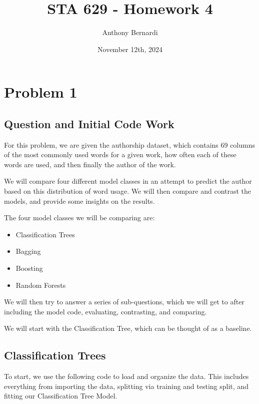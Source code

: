 \documentclass[12pt, letterpaper]{article}
\title{STA 629 - Homework 4}
\author{Anthony Bernardi}
\date{November 12th, 2024}
\begin{document}
\maketitle

\section{Problem 1}

\subsection{Question and Initial Code Work}

For this problem, we are given the authorship dataset, which contains 69 columns of the most commonly used words for a given work, how often each of these words are used, and then finally the author of the work. 

We will compare four different model classes in an attempt to predict the author based on this distribution of word usage. We will then compare and contrast the models, and provide some insights on the results. 

The four model classes we will be comparing are: 

\begin{itemize}
  \item Classification Trees 
  \item Bagging 
  \item Boosting 
  \item Random Forests
\end{itemize}

We will then try to answer a series of sub-questions, which we will get to after including the model code, evaluating, contrasting, and comparing. 

We will start with the Classification Tree, which can be thought of as a baseline. 

\subsection{Classification Trees}

To start, we use the following code to load and organize the data. This includes everything from importing the data, splitting via training and testing split, and fitting our Classification Tree Model. 
\end{document}
